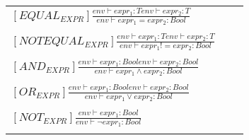 \begin{table}
    \centering
    \begin{tabular}{lr>{\raggedright\arraybackslash}p{6cm}}
        $[EQUAL_{EXPR}] \frac
            {env\vdash expr_1: T env\vdash expr_2: T}
            {env\vdash expr_1 = expr_2: Bool}$
        \\
        \\
        $[NOTEQUAL_{EXPR}] \frac
            {env\vdash expr_1: T env\vdash expr_2: T}
            {env\vdash expr_1 != expr_2: Bool}$
        \\
        \\
        $[AND_{EXPR}] \frac
            {env\vdash expr_1: Bool env\vdash expr_2: Bool}
            {env\vdash expr_1 \land expr_2: Bool}$
        \\
        \\
        $[OR_{EXPR}] \frac
            {env\vdash expr_1: Bool env\vdash expr_2: Bool}
            {env\vdash expr_1 \lor expr_2: Bool}$
        \\
        \\
        $[NOT_{EXPR}] \frac
            {env\vdash expr_1: Bool}
            {env\vdash \neg expr_1 : Bool}$
        \\
        \\
    \end{tabular}
\end{table}
